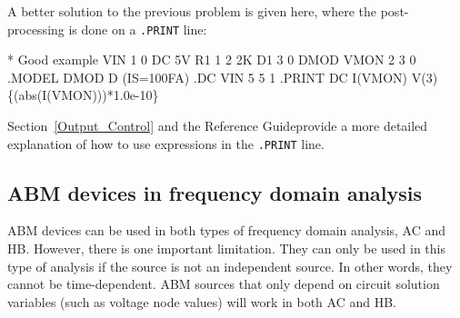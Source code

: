 A better solution to the previous problem is given here, where the
post-processing is done on a \verb|.PRINT| line:

\begin{vquote}
\color{blue}* Good example \color{black}
VIN 1 0 DC 5V
R1 1 2 2K
D1 3 0 DMOD
VMON 2 3 0
.MODEL DMOD D (IS=100FA)
.DC VIN 5 5 1
.PRINT DC I(VMON) V(3) \color{XyceRed} \{(abs(I(VMON)))*1.0e-10\} \color{black}
\end{vquote}

Section~\ref{Output_Control} and the \Xyce{} Reference
Guide\ReferenceGuide provide a more detailed explanation of how to use
expressions in the \texttt{.PRINT} line.

\subsection{ABM devices in frequency domain analysis}

ABM devices can be used in both types of frequency domain analysis, AC and HB.  
However, there is one important limitation.   They can only be used in this type of analysis 
if the source is not an independent source.  In other words, they cannot be time-dependent.
ABM sources that only depend on circuit solution variables (such as voltage node values) 
will work in both AC and HB.


